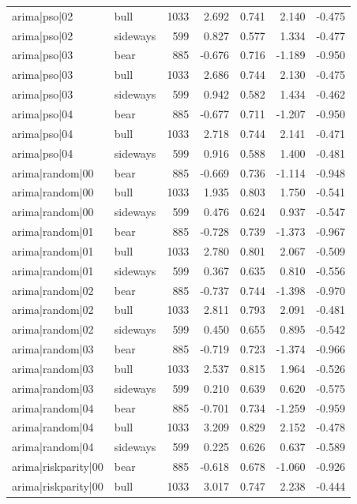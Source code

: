\begin{table}
\begin{tabular}{llrrrrr}
arima|pso|02 & bull & 1033 & 2.692 & 0.741 & 2.140 & -0.475 \\
arima|pso|02 & sideways & 599 & 0.827 & 0.577 & 1.334 & -0.477 \\
arima|pso|03 & bear & 885 & -0.676 & 0.716 & -1.189 & -0.950 \\
arima|pso|03 & bull & 1033 & 2.686 & 0.744 & 2.130 & -0.475 \\
arima|pso|03 & sideways & 599 & 0.942 & 0.582 & 1.434 & -0.462 \\
arima|pso|04 & bear & 885 & -0.677 & 0.711 & -1.207 & -0.950 \\
arima|pso|04 & bull & 1033 & 2.718 & 0.744 & 2.141 & -0.471 \\
arima|pso|04 & sideways & 599 & 0.916 & 0.588 & 1.400 & -0.481 \\
arima|random|00 & bear & 885 & -0.669 & 0.736 & -1.114 & -0.948 \\
arima|random|00 & bull & 1033 & 1.935 & 0.803 & 1.750 & -0.541 \\
arima|random|00 & sideways & 599 & 0.476 & 0.624 & 0.937 & -0.547 \\
arima|random|01 & bear & 885 & -0.728 & 0.739 & -1.373 & -0.967 \\
arima|random|01 & bull & 1033 & 2.780 & 0.801 & 2.067 & -0.509 \\
arima|random|01 & sideways & 599 & 0.367 & 0.635 & 0.810 & -0.556 \\
arima|random|02 & bear & 885 & -0.737 & 0.744 & -1.398 & -0.970 \\
arima|random|02 & bull & 1033 & 2.811 & 0.793 & 2.091 & -0.481 \\
arima|random|02 & sideways & 599 & 0.450 & 0.655 & 0.895 & -0.542 \\
arima|random|03 & bear & 885 & -0.719 & 0.723 & -1.374 & -0.966 \\
arima|random|03 & bull & 1033 & 2.537 & 0.815 & 1.964 & -0.526 \\
arima|random|03 & sideways & 599 & 0.210 & 0.639 & 0.620 & -0.575 \\
arima|random|04 & bear & 885 & -0.701 & 0.734 & -1.259 & -0.959 \\
arima|random|04 & bull & 1033 & 3.209 & 0.829 & 2.152 & -0.478 \\
arima|random|04 & sideways & 599 & 0.225 & 0.626 & 0.637 & -0.589 \\
arima|riskparity|00 & bear & 885 & -0.618 & 0.678 & -1.060 & -0.926 \\
arima|riskparity|00 & bull & 1033 & 3.017 & 0.747 & 2.238 & -0.444 \\

\end{tabular}
\end{table}

